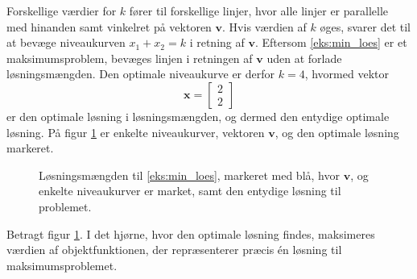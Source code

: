%
Forskellige værdier for $k$ fører til forskellige linjer, hvor alle linjer er parallelle med hinanden samt vinkelret på vektoren $\textbf{v}$. 
Hvis værdien af $k$ øges, svarer det til at bevæge niveaukurven $x_1+x_2=k$ i retning af $\textbf{v}$.
Eftersom \ref{eks:min_loes} er et maksimumsproblem, bevæges linjen i retningen af $\textbf{v}$ uden at forlade løsningsmængden. 
Den optimale niveaukurve er derfor $k = 4$, hvormed vektor
%
$$
\textbf{x}=
\begin{bmatrix}
2\\2
\end{bmatrix}
$$
%
er den optimale løsning i løsningsmængden, og dermed den entydige optimale løsning. 
På figur \ref{fig:opti_loes} er enkelte niveaukurver, vektoren $\mathbf{v}$, og den optimale løsning markeret.
%
\begin{figure}[H]
\centering
%
\caption{Løsningsmængden til \ref{eks:min_loes}, markeret med blå, hvor $\mathbf{v}$, og enkelte niveaukurver er market, samt den entydige løsning til problemet.}
%
\label{fig:opti_loes}
\end{figure}
\noindent
%
Betragt figur \ref{fig:opti_loes}. 
I det hjørne, hvor den optimale løsning findes, maksimeres værdien af objektfunktionen, der repræsenterer præcis én løsning til maksimumsproblemet. 
